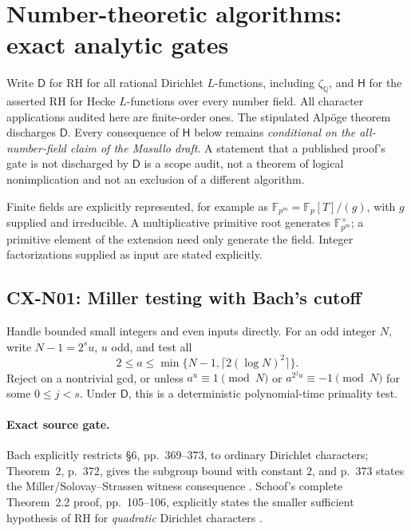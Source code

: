 \section{Number-theoretic algorithms: exact analytic gates}
\label{sec:number-algorithms}

Write \(\mathsf D\) for RH for all rational Dirichlet \(L\)-functions,
including \(\zeta_{\mathbb Q}\), and \(\mathsf H\) for the asserted RH for
Hecke \(L\)-functions over every number field. All character applications audited here are finite-order ones. The stipulated
Alp\"oge theorem discharges \(\mathsf D\). Every consequence of
\(\mathsf H\) below remains \emph{conditional on the all-number-field
claim of the Masullo draft}. A statement that a published proof's gate is
not discharged by \(\mathsf D\) is a scope audit, not a theorem of logical
nonimplication and not an exclusion of a different algorithm.

Finite fields are explicitly represented, for example as
\(\mathbb F_{p^m}=\mathbb F_p[T]/(g)\), with \(g\) supplied and irreducible.
A multiplicative primitive root generates \(\mathbb F_{p^m}^{\times}\);
a primitive element of the extension need only generate the field.
Integer factorizations supplied as input are stated explicitly.

\subsection{CX-N01: Miller testing with Bach's cutoff}
\label{cx-n01}

Handle bounded small integers and even inputs directly. For an odd
integer \(N\), write \(N-1=2^s u\), \(u\) odd, and test all
\[
 2\leq a\leq\min\{N-1,\lceil2(\log N)^2\rceil\}.
\]
Reject on a nontrivial gcd, or unless \(a^u\equiv1\pmod N\) or
\(a^{2^ju}\equiv-1\pmod N\) for some \(0\leq j<s\).
Under \(\mathsf D\), this is a deterministic polynomial-time primality test.

\paragraph{Exact source gate.}
Bach explicitly restricts \S6, pp.~369--373, to ordinary Dirichlet
characters; Theorem~2, p.~372, gives the subgroup bound with constant \(2\),
and p.~373 states the Miller/Solovay--Strassen witness consequence
\cite{CXNBach90}. Schoof's complete Theorem~2.2 proof, pp.~105--106,
explicitly states the smaller sufficient hypothesis of RH for
\emph{quadratic} Dirichlet characters \cite{CXNSchoof08}.

